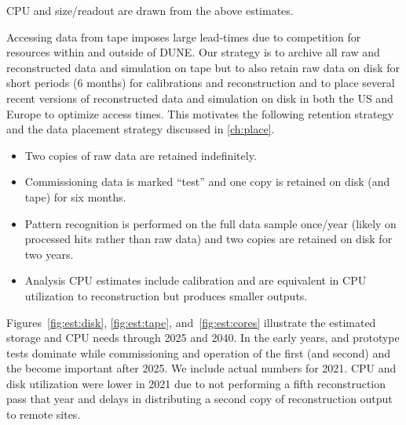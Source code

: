 \documentclass[../main-v1.tex]{subfiles}
\begin{document}
CPU and size/readout are drawn from the above estimates. 

Accessing data from tape imposes large lead-times due to competition for resources within and outside of DUNE.  Our strategy is to archive all raw and reconstructed data and simulation on tape but to also retain raw data on disk for short periods (6 months) for calibrations and reconstruction and to place several recent versions of reconstructed data and simulation on disk in both the US and Europe to optimize access times.  This motivates the following retention strategy and the data placement strategy discussed in \ref{ch:place}. 

\begin{itemize}
\item Two copies of raw data are retained indefinitely.
\item Commissioning data is marked ``test'' and one copy is retained on disk (and tape) for six months. 
\item Pattern recognition is performed on the full data sample once/year (likely on processed hits rather than raw data)  and two copies are retained on disk for two years.  
\item Analysis CPU estimates include calibration and are  equivalent in CPU utilization to reconstruction but produces smaller outputs. 
\end{itemize}

Figures~\ref{fig:est:disk}, \ref{fig:est:tape}, and~\ref{fig:est:cores} illustrate the estimated storage and CPU needs through 2025 and 2040.  In the early years,   and  prototype tests dominate while commissioning and operation of the first (and second)  and the  become important after 2025. We include actual numbers for 2021. CPU and disk utilization were lower in 2021 due to not performing a fifth reconstruction pass that year %
and delays in distributing a second copy of reconstruction output to remote sites. 
\end{document}

